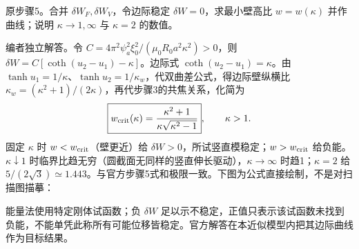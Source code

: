 \begin{exercise}\label{ex:hist03-mhd-5}
原步骤5。合并 $\delta W_F,\delta W_V$，令边际稳定 $\delta W=0$，求最小壁高比 $w=w(\kappa)$ 并作曲线；说明 $\kappa\to1,\infty$ 与 $\kappa=2$ 的数值。
\end{exercise}
\begin{solution}
编者独立解答。令 $C=4\pi^2\psi_a^2\xi_0^2/(\mu_0R_0a^2\kappa^2)>0$，则 $\delta W=C[\coth(u_2-u_1)-\kappa]$。边际式 $\coth(u_2-u_1)=\kappa$。由 $\tanh u_1=1/\kappa$、$\tanh u_2=1/\kappa_w$，代双曲差公式，得边际壁纵横比 $\kappa_w=(\kappa^2+1)/(2\kappa)$，再代步骤3的共焦关系，化简为
\begin{equation}\boxed{w_{\rm crit}(\kappa)=\frac{\kappa^2+1}{\kappa\sqrt{\kappa^2-1}}},\qquad\kappa>1.
\end{equation}
固定 $\kappa$ 时 $w<w_{\rm crit}$（壁更近）给 $\delta W>0$，所试竖直模稳定；$w>w_{\rm crit}$ 给负能。$\kappa\downarrow1$ 时临界比趋无穷（圆截面无同样的竖直伸长驱动），$\kappa\to\infty$ 时趋1；$\kappa=2$ 给 $5/(2\sqrt3)\simeq1.443$。与官方步骤5式和极限一致。下图为公式直接绘制，不是对扫描图描摹：
\begin{center}\end{center}
能量法使用特定刚体试函数；负 $\delta W$ 足以示不稳定，正值只表示该试函数未找到负能，不能单凭此称所有可能位移皆稳定。官方解答在本近似模型内把其边际曲线作为目标结果。
\end{solution}
